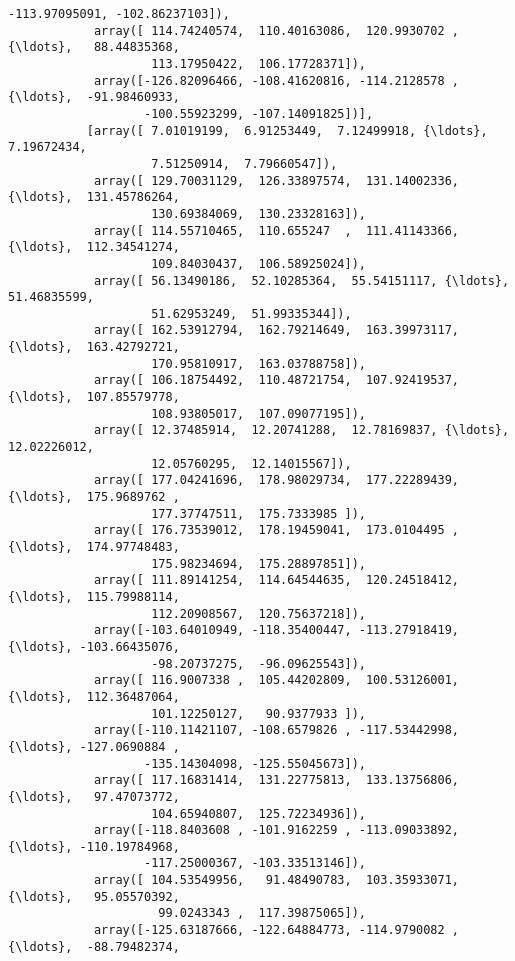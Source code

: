 \documentclass[11pt]{article}
\begin{document}
\begin{Verbatim}[commandchars=\\\{\}]
                   -113.97095091, -102.86237103]),
            array([ 114.74240574,  110.40163086,  120.9930702 , {\ldots},   88.44835368,
                    113.17950422,  106.17728371]),
            array([-126.82096466, -108.41620816, -114.2128578 , {\ldots},  -91.98460933,
                   -100.55923299, -107.14091825])],
           [array([ 7.01019199,  6.91253449,  7.12499918, {\ldots},  7.19672434,
                    7.51250914,  7.79660547]),
            array([ 129.70031129,  126.33897574,  131.14002336, {\ldots},  131.45786264,
                    130.69384069,  130.23328163]),
            array([ 114.55710465,  110.655247  ,  111.41143366, {\ldots},  112.34541274,
                    109.84030437,  106.58925024]),
            array([ 56.13490186,  52.10285364,  55.54151117, {\ldots},  51.46835599,
                    51.62953249,  51.99335344]),
            array([ 162.53912794,  162.79214649,  163.39973117, {\ldots},  163.42792721,
                    170.95810917,  163.03788758]),
            array([ 106.18754492,  110.48721754,  107.92419537, {\ldots},  107.85579778,
                    108.93805017,  107.09077195]),
            array([ 12.37485914,  12.20741288,  12.78169837, {\ldots},  12.02226012,
                    12.05760295,  12.14015567]),
            array([ 177.04241696,  178.98029734,  177.22289439, {\ldots},  175.9689762 ,
                    177.37747511,  175.7333985 ]),
            array([ 176.73539012,  178.19459041,  173.0104495 , {\ldots},  174.97748483,
                    175.98234694,  175.28897851]),
            array([ 111.89141254,  114.64544635,  120.24518412, {\ldots},  115.79988114,
                    112.20908567,  120.75637218]),
            array([-103.64010949, -118.35400447, -113.27918419, {\ldots}, -103.66435076,
                    -98.20737275,  -96.09625543]),
            array([ 116.9007338 ,  105.44202809,  100.53126001, {\ldots},  112.36487064,
                    101.12250127,   90.9377933 ]),
            array([-110.11421107, -108.6579826 , -117.53442998, {\ldots}, -127.0690884 ,
                   -135.14304098, -125.55045673]),
            array([ 117.16831414,  131.22775813,  133.13756806, {\ldots},   97.47073772,
                    104.65940807,  125.72234936]),
            array([-118.8403608 , -101.9162259 , -113.09033892, {\ldots}, -110.19784968,
                   -117.25000367, -103.33513146]),
            array([ 104.53549956,   91.48490783,  103.35933071, {\ldots},   95.05570392,
                     99.0243343 ,  117.39875065]),
            array([-125.63187666, -122.64884773, -114.9790082 , {\ldots},  -88.79482374,

\end{Verbatim}
\end{document}

